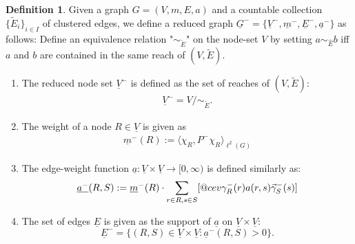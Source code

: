 \documentclass[reqno,12pt,letterpaper]{amsart}
\makeatletter
\numberwithin{equation}{section}
\DeclareRobustCommand{\cev}[1]{%
	\mathpalette\do@cev{#1}%
}
\newcommand{\do@cev}[2]{%
	\fix@cev{#1}{+}%
	\reflectbox{$\m@th#1\vec{\reflectbox{$\fix@cev{#1}{-}\m@th#1#2\fix@cev{#1}{+}$}}$}%
	\fix@cev{#1}{-}%
}
\newcommand{\fix@cev}[2]{%
	\ifx#1\displaystyle
	\mkern#23mu
	\else
	\ifx#1\textstyle
	\mkern#23mu
	\else
	\ifx#1\scriptstyle
	\mkern#22mu
	\else
	\mkern#22mu
	\fi
	\fi
	\fi
}
\newcommand{\1}{\mathds{1}}
\theoremstyle{definition}
\newtheorem{Def}[Th]{Definition}
\makeatother
\begin{document}
	
	
	\begin{Def}\label{indeg_coarse_G_def} Given a graph $G = (V, m, E, a)$ and a countable collection $\{\tilde{E}_i\}_{i \in I}$ of clustered edges,
		we define a reduced graph $\underline{G}^- = \{\underline{V}^-, \underline{m}^-, \underline{E}^-,\underline{a}^-\}$ as follows:
		Define an equivalence relation "$\sim_{\tilde{E}}$" on the node-set $V$ by setting $a \sim_{\hat{E}} b $ iff
		$a$ and $b$ are contained in the same reach of $(V, \tilde{E})$.
		\begin{enumerate}[label=(\roman*), topsep=0pt, itemsep=-.2em]
			\item 	The reduced node set $\underline{V}^-$ is defined as the set of reaches of $(V, \tilde{E})$:
			\begin{align}
				\underline{V}^- = V/ \sim_{\tilde{E}}.
			\end{align}
			\item The weight of a node $R \in \underline{V}$ is given as
			\begin{align}\label{in_deg_mass}
				\underline{m}^-(R) := \langle  \chi_R ,P^-  \chi_R  \rangle_{\ell^2(G)}
			\end{align}
			\item The edge-weight function $\underline{a}:\underline{V} \times \underline{V} \rightarrow [0, \infty)$ is defined similarly as:
			\begin{align}\label{weight_def_-}
				\underline{a^-}(R, S) := \underline{m}^-(R)\cdot\sum\limits_{r \in R, s \in S} 
				[
				\cev{\gamma}^{-}_{R}(r)
				a(r,s)
				\vec{\gamma}_S^{-}(s)
				]
			\end{align}
			\item The set of edges $\underline{E}$ is given as the support of $\underline{a}$ on $\underline{V} \times \underline{V}$:
			\begin{equation}
				\underline{E}^- = \{(R,S)\in\underline{V}\times\underline{V}: \underline{a}^-(R,S) >0 \}.
			\end{equation}
		\end{enumerate}
	\end{Def}
	
	\medskip
	
\end{document}

